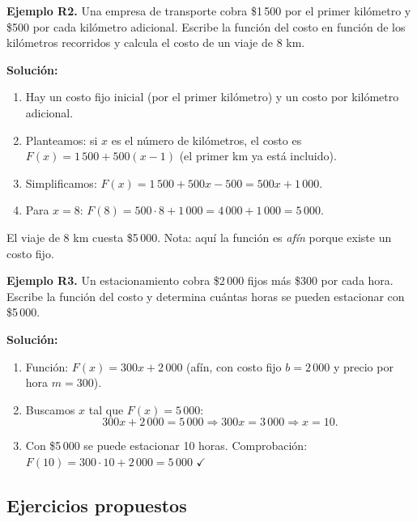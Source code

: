 \documentclass[12pt, letterpaper]{article}
\begin{document}
\textbf{Ejemplo R2.} Una empresa de transporte cobra \$1\,500 por el primer kilómetro y \$500 por cada kilómetro adicional. Escribe la función del costo en función de los kilómetros recorridos y calcula el costo de un viaje de 8 km.

\begin{cuadrosolucion}
  \textbf{Solución:}
  \begin{enumerate}
    \item Hay un costo fijo inicial (por el primer kilómetro) y un costo por kilómetro adicional.
    \item Planteamos: si $x$ es el número de kilómetros, el costo es $F(x) = 1\,500 + 500(x - 1)$ (el primer km ya está incluido).
    \item Simplificamos: $F(x) = 1\,500 + 500x - 500 = 500x + 1\,000$.
    \item Para $x = 8$: $F(8) = 500 \cdot 8 + 1\,000 = 4\,000 + 1\,000 = 5\,000$.
  \end{enumerate}
  El viaje de 8 km cuesta \$5\,000. Nota: aquí la función es \emph{afín} porque existe un costo fijo.
\end{cuadrosolucion}

\textbf{Ejemplo R3.} Un estacionamiento cobra \$2\,000 fijos más \$300 por cada hora. Escribe la función del costo y determina cuántas horas se pueden estacionar con \$5\,000.

\begin{cuadrosolucion}
  \textbf{Solución:}
  \begin{enumerate}
    \item Función: $F(x) = 300x + 2\,000$ (afín, con costo fijo $b = 2\,000$ y precio por hora $m = 300$).
    \item Buscamos $x$ tal que $F(x) = 5\,000$:
          $$300x + 2\,000 = 5\,000 \Rightarrow 300x = 3\,000 \Rightarrow x = 10.$$
    \item Con \$5\,000 se puede estacionar 10 horas. Comprobación: $F(10) = 300 \cdot 10 + 2\,000 = 5\,000$ $\checkmark$
  \end{enumerate}
\end{cuadrosolucion}

\subsection{Ejercicios propuestos}
\end{document}
